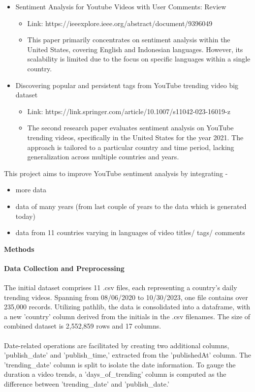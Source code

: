 \documentclass[12pt]{article}
\begin{document}
{\begin{itemize}
\item Sentiment Analysis for Youtube Videos with User Comments: Review
\begin{itemize}
\item Link: https://ieeexplore.ieee.org/abstract/document/9396049
\item This paper primarily concentrates on sentiment analysis within the United States, covering English and Indonesian languages. However, its scalability is limited due to the focus on specific languages within a single country. 
\end{itemize}
\item Discovering popular and persistent tags from YouTube trending video big dataset
\begin{itemize}
\item Link: https://link.springer.com/article/10.1007/s11042-023-16019-z
\item The second research paper evaluates sentiment analysis on YouTube trending videos, specifically in the United States for the year 2021. The approach is tailored to a particular country and time period, lacking generalization across multiple countries and years.
\end{itemize}
\end{itemize}
{This project aims to improve YouTube sentiment analysis by integrating -}
\begin{itemize}
\item more data
\item data of many years (from last couple of years to the data which is generated today)
\item data from 11 countries varying in languages of video titles/ tags/ comments
\end{itemize}
\vspace{1\baselineskip}
{\bf \large Methods}\\ \\
{\bf  Data Collection and Preprocessing}\\ \\
{The initial dataset comprises 11 .csv files, each representing a country's daily trending videos. Spanning from 08/06/2020 to 10/30/2023, one file contains over 235,000 records. Utilizing pathlib, the data is consolidated into a dataframe, with a new 'country' column derived from the initials in the .csv filenames. The size of combined dataset is 2,552,859 rows and 17 columns.}\\ \\
{Date-related operations are facilitated by creating two additional columns, 'publish\_date' and 'publish\_time,' extracted from the 'publishedAt' column. The 'trending\_date' column is split to isolate the date information. To gauge the duration a video trends, a 'days\_of\_trending' column is computed as the difference between 'trending\_date' and 'publish\_date.'}\\ \\
}
\end{document}
